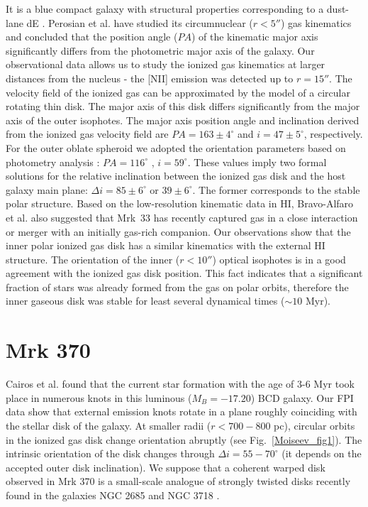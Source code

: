 \documentclass[epjCONF]{svjour}
\begin{document}
It is a blue compact galaxy with structural properties corresponding to a dust-lane dE \cite{Bravo-Alfaro2004}. Perosian et al.\cite{Petrosian2002} have studied its circumnuclear  ($r<5''$) gas kinematics and concluded  that the position angle ($PA$) of the kinematic major axis significantly differs  from the photometric major axis of the galaxy. Our observational data allows us to study the ionized gas kinematics at   larger distances from the nucleus - the [NII] emission was detected up to $r=15''$. The velocity field of the ionized gas can be approximated by the model of a circular rotating thin disk. The major axis of this disk  differs significantly from the major axis of the outer isophotes. The major axis position angle   and inclination  derived from the ionized gas velocity field are $PA=163\pm4^\circ$  and $i=47\pm5^\circ$, respectively. For the outer oblate spheroid we adopted the orientation parameters based on photometry analysis \cite{Amorin2009}:
$PA=116^\circ$ , $i=59^\circ$. These values imply two formal solutions for the relative inclination between the ionized gas disk and the host galaxy main plane:  $\Delta i=85\pm6^\circ$ or $39\pm6^\circ$. The former  corresponds to the stable polar structure. Based on the low-resolution kinematic data in HI,  Bravo-Alfaro et al. \cite{Bravo-Alfaro2004} also suggested that Mrk~33 has recently captured gas in a close interaction or merger with an initially gas-rich companion. Our observations show that the inner polar ionized gas disk has a similar kinematics with the external HI structure. The orientation of the inner ($r<10''$) optical isophotes is in a good agreement with the ionized gas disk position. This fact indicates that a significant fraction of stars was already formed from the gas on  polar orbits, therefore the inner gaseous disk was stable for least several dynamical times
($\sim10$ Myr).

\section{Mrk 370}

Cairos et al. \cite{Cairos2002} found that the current star formation with the age of 3-6 Myr took place in numerous knots in
this luminous ($M_B=-17.20$) BCD galaxy. Our FPI data show that external emission knots rotate in a plane
roughly coinciding with the stellar disk of the galaxy. At smaller radii ($r<700-800$ pc), circular orbits in the ionized gas
disk change  orientation abruptly (see Fig.~\ref{Moiseev_fig1}). The intrinsic orientation of the disk changes through  $\Delta i=55-70^\circ$  (it depends on the accepted outer disk inclination). We suppose that a coherent warped disk observed in Mrk 370 is a small-scale analogue of strongly twisted disks recently found in the galaxies NGC 2685 \cite{Josza2009} and NGC 3718 \cite{Sparke2009}.
\end{document}
